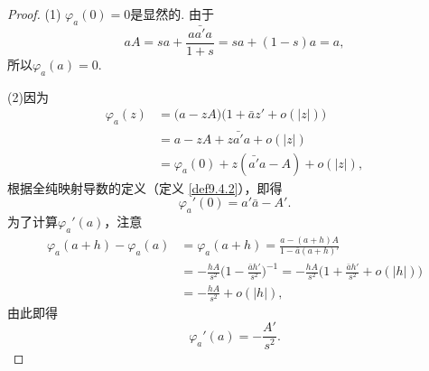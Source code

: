 \begin{proof}
  (1) $\varphi_a(0)=0$是显然的. 由于
  \[
    aA = sa + \frac{a\bar {a'}a}{1+s} = sa + (1 - s)a = a,
  \]
  所以$\varphi_a(a)=0$.

  (2)因为
    \begin{align*}
      \varphi_a(z) & = \big(a - zA)(1 + \bar az' + o(|z|)\big)\\
      & = a - zA + z\bar {a'}a + o(|z|)\\
      & = \varphi_a(0) + z(\bar {a'}a - A) + o(|z|),
    \end{align*}
  根据全纯映射导数的定义（定义 \ref{def9.4.2}），即得
  \[
    \varphi_a'(0) = a'\bar a - A'.
  \]
  为了计算$\varphi_a'(a)$，注意
  \begin{align*}
    \varphi_a(a+h) - \varphi_a(a) & = \varphi_a(a+h) = \frac{a-(a+h)A}{1-\bar a(a+h)'}\\
    & = -\frac{hA}{s^2}\bigg(1-\frac{\bar ah'}{s^2}\bigg)^{-1}=
    - \frac{hA}{s^2}\bigg(1+\frac{\bar ah'}{s^2}+o(|h|)\bigg)\\
    & = -\frac{hA}{s^2}+o(|h|),
  \end{align*}
  由此即得
  \[
    \varphi_a'(a) = -\frac{A'}{s^2}.
  \]


\end{proof}
